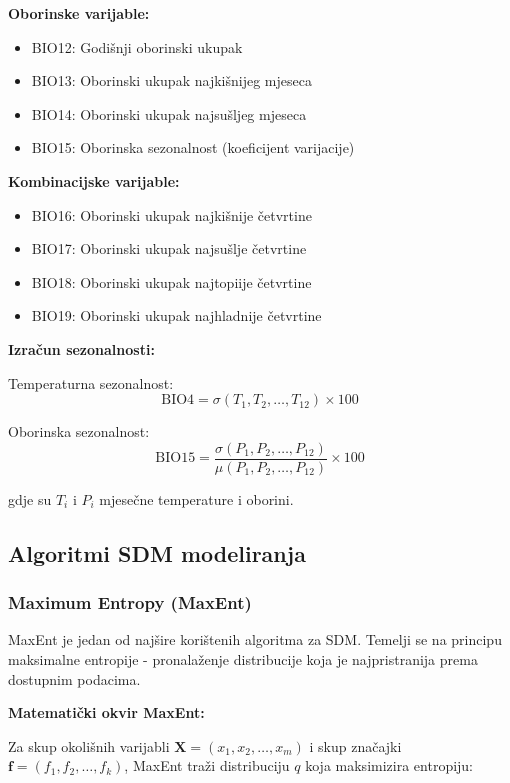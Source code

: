 \documentclass[11pt,oneside]{book}
\begin{document}
\textbf{Oborinske varijable:}
\begin{itemize}
	\item BIO12: Godišnji oborinski ukupak
	\item BIO13: Oborinski ukupak najkišnijeg mjeseca
	\item BIO14: Oborinski ukupak najsušljeg mjeseca
	\item BIO15: Oborinska sezonalnost (koeficijent varijacije)
\end{itemize}

\textbf{Kombinacijske varijable:}
\begin{itemize}
	\item BIO16: Oborinski ukupak najkišnije četvrtine
	\item BIO17: Oborinski ukupak najsušlje četvrtine
	\item BIO18: Oborinski ukupak najtopiije četvrtine
	\item BIO19: Oborinski ukupak najhladnije četvrtine
\end{itemize}

\textbf{Izračun sezonalnosti:}

Temperaturna sezonalnost:
\begin{equation}
	\text{BIO4} = \sigma(T_1, T_2, \ldots, T_{12}) \times 100
\end{equation}

Oborinska sezonalnost:
\begin{equation}
	\text{BIO15} = \frac{\sigma(P_1, P_2, \ldots, P_{12})}{\mu(P_1, P_2, \ldots, P_{12})} \times 100
\end{equation}

gdje su $T_i$ i $P_i$ mjesečne temperature i oborini.

\subsection{Algoritmi SDM modeliranja}

\subsubsection{Maximum Entropy (MaxEnt)}

MaxEnt je jedan od najšire korištenih algoritma za SDM. Temelji se na principu maksimalne entropije - pronalaženje distribucije koja je najpristranija prema dostupnim podacima.

\textbf{Matematički okvir MaxEnt:}

Za skup okolišnih varijabli $\mathbf{X} = (x_1, x_2, \ldots, x_m)$ i skup značajki $\mathbf{f} = (f_1, f_2, \ldots, f_k)$, MaxEnt traži distribuciju $q$ koja maksimizira entropiju:
\end{document}
